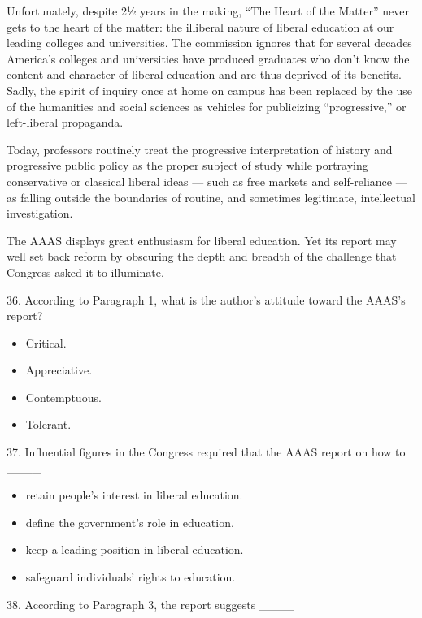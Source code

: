 \documentclass[UTF8,11pt]{ctexart}
\begin{document}
Unfortunately, despite 2½ years in the making, “The Heart of the Matter” never gets to the heart of the matter: the illiberal nature of liberal education at our leading colleges and universities. The commission ignores that for several decades America’s colleges and universities have produced graduates who don’t know the content and character of liberal education and are thus deprived of its benefits. Sadly, the spirit of inquiry once at home on campus has been replaced by the use of the humanities and social sciences as vehicles for publicizing “progressive,” or left-liberal propaganda.


Today, professors routinely treat the progressive interpretation of history and progressive public policy as the proper subject of study while portraying conservative or classical liberal ideas — such as free markets and self-reliance — as falling outside the boundaries of routine, and sometimes legitimate, intellectual investigation.


The AAAS displays great enthusiasm for liberal education. Yet its report may well set back reform by obscuring the depth and breadth of the challenge that Congress asked it to illuminate.


36. According to Paragraph 1, what is the author’s attitude toward the AAAS’s report?


\begin{itemize}[leftmargin=2em,itemsep=.2em,topsep=.4em]\item[A.] Critical.
\item[B.] Appreciative.
\item[C.] Contemptuous.
\item[D.] Tolerant.
\end{itemize}

37. Influential figures in the Congress required that the AAAS report on how to \_\_\_\_


\begin{itemize}[leftmargin=2em,itemsep=.2em,topsep=.4em]\item[A.] retain people’s interest in liberal education.
\item[B.] define the government’s role in education.
\item[C.] keep a leading position in liberal education.
\item[D.] safeguard individuals’ rights to education.
\end{itemize}

38. According to Paragraph 3, the report suggests \_\_\_\_
\end{document}
